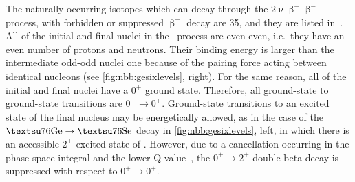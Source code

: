 The naturally occurring isotopes which can decay through the $2\upnu\upbeta^-\upbeta^-$
process, with forbidden or suppressed $\upbeta^-$ decay are 35, and they are listed
in~\cite{Giunti2007}. All of the initial and final nuclei in the \nnbbm\ process are
even-even, i.e.~they have an even number of protons and neutrons. Their binding energy is
larger than the intermediate odd-odd nuclei one because of the pairing force acting
between identical nucleons (see \cref{fig:nbb:gesixlevels}, right). For the same reason,
all of the initial and final nuclei have a $0^+$ ground state.  Therefore, all
ground-state to ground-state transitions are $0^+\rightarrow0^+$. Ground-state transitions
to an excited state of the final nucleus may be energetically allowed, as in the case of
the $\text{\gesix} \rightarrow \text{\nuc{Se}{76}}$ decay in \cref{fig:nbb:gesixlevels},
left, in which there is an accessible $2^+$ excited state of . However, due to
a cancellation occurring in the phase space integral and the lower
Q-value~\cite{Tomoda1991}, the $0^+ \rightarrow 2^+$ double-beta decay is suppressed with
respect to $0^+ \rightarrow 0^+$.

